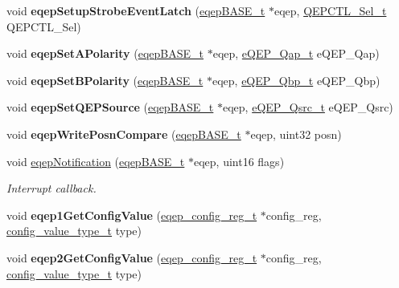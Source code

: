 \begin{DoxyCompactItemize}
void {\bfseries eqep\+Setup\+Strobe\+Event\+Latch} (\mbox{\hyperlink{reg__eqep_8h_a794db63555812863c39c5d214fd4f215}{eqep\+B\+A\+S\+E\+\_\+t}} $\ast$eqep, \mbox{\hyperlink{eqep_8h_a509391511ea6a9b74effc7296a02ed1a}{Q\+E\+P\+C\+T\+L\+\_\+\+Sel\+\_\+t}} Q\+E\+P\+C\+T\+L\+\_\+\+Sel)
\item 
\mbox{\label{group__eQEP_ga2147626438e958276ec3768d2f9a6236}} 
void {\bfseries eqep\+Set\+A\+Polarity} (\mbox{\hyperlink{reg__eqep_8h_a794db63555812863c39c5d214fd4f215}{eqep\+B\+A\+S\+E\+\_\+t}} $\ast$eqep, \mbox{\hyperlink{eqep_8h_a37d85471445d50ce16eeab11e2270736}{e\+Q\+E\+P\+\_\+\+Qap\+\_\+t}} e\+Q\+E\+P\+\_\+\+Qap)
\item 
\mbox{\label{group__eQEP_gaa47151f37726798ae0a763421d46029e}} 
void {\bfseries eqep\+Set\+B\+Polarity} (\mbox{\hyperlink{reg__eqep_8h_a794db63555812863c39c5d214fd4f215}{eqep\+B\+A\+S\+E\+\_\+t}} $\ast$eqep, \mbox{\hyperlink{eqep_8h_afc29a5e24b03a06d4e52a93fbcfee822}{e\+Q\+E\+P\+\_\+\+Qbp\+\_\+t}} e\+Q\+E\+P\+\_\+\+Qbp)
\item 
\mbox{\label{group__eQEP_ga0e92f153308d96d36cdcfa3f46d28844}} 
void {\bfseries eqep\+Set\+Q\+E\+P\+Source} (\mbox{\hyperlink{reg__eqep_8h_a794db63555812863c39c5d214fd4f215}{eqep\+B\+A\+S\+E\+\_\+t}} $\ast$eqep, \mbox{\hyperlink{eqep_8h_aecc2adc0247918c6cff8d2405e18902c}{e\+Q\+E\+P\+\_\+\+Qsrc\+\_\+t}} e\+Q\+E\+P\+\_\+\+Qsrc)
\item 
\mbox{\label{group__eQEP_ga35a21631cf457ea79c28ed79825e7308}} 
void {\bfseries eqep\+Write\+Posn\+Compare} (\mbox{\hyperlink{reg__eqep_8h_a794db63555812863c39c5d214fd4f215}{eqep\+B\+A\+S\+E\+\_\+t}} $\ast$eqep, uint32 posn)
\item 
void \mbox{\hyperlink{group__eQEP_ga72d2907736f69bffc6183f5a610f22a2}{eqep\+Notification}} (\mbox{\hyperlink{reg__eqep_8h_a794db63555812863c39c5d214fd4f215}{eqep\+B\+A\+S\+E\+\_\+t}} $\ast$eqep, uint16 flags)
\begin{DoxyCompactList}\small\item\em Interrupt callback. \end{DoxyCompactList}\item 
\mbox{\label{group__eQEP_gad23aa437c39f0a079b12ac1cdc0e4338}} 
void {\bfseries eqep1\+Get\+Config\+Value} (\mbox{\hyperlink{structeqep__config__reg}{eqep\+\_\+config\+\_\+reg\+\_\+t}} $\ast$config\+\_\+reg, \mbox{\hyperlink{sys__common_8h_a9daf9a5992391b058477d28d107ee5e2}{config\+\_\+value\+\_\+type\+\_\+t}} type)
\item 
\mbox{\label{group__eQEP_gad1c4b4d087c0f28a831ead4cde2ee055}} 
void {\bfseries eqep2\+Get\+Config\+Value} (\mbox{\hyperlink{structeqep__config__reg}{eqep\+\_\+config\+\_\+reg\+\_\+t}} $\ast$config\+\_\+reg, \mbox{\hyperlink{sys__common_8h_a9daf9a5992391b058477d28d107ee5e2}{config\+\_\+value\+\_\+type\+\_\+t}} type)
\end{DoxyCompactItemize}


